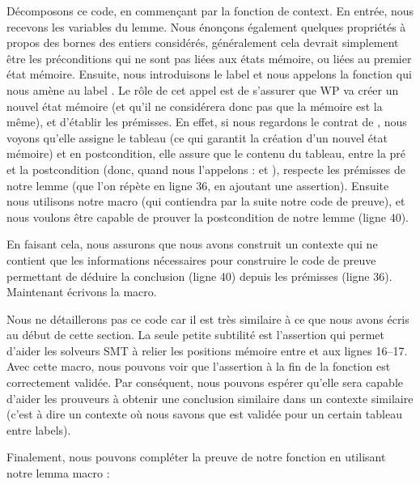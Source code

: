Décomposons ce code, en commençant par la fonction de context. En entrée, nous
recevons les variables du lemme. Nous énonçons également quelques propriétés à
propos des bornes des entiers considérés, généralement cela devrait simplement
être les préconditions qui ne sont pas liées aux états mémoire, ou liées au
premier état mémoire. Ensuite, nous introduisons le label  et nous
appelons la fonction  qui nous amène au label
. Le rôle de cet appel est de s'assurer que WP va créer un nouvel
état mémoire (et qu'il ne considérera donc pas que la mémoire est la même), et
d'établir les prémisses. En effet, si nous regardons le contrat de
, nous voyons qu'elle assigne le tableau (ce qui
garantit la création d'un nouvel état mémoire) et en postcondition, elle assure
que le contenu du tableau, entre la pré et la postcondition (donc, quand nous
l'appelons :  et ), respecte les prémisses de notre
lemme (que l'on répète en ligne 36, en ajoutant une assertion). Ensuite nous
utilisons notre macro  (qui contiendra par la suite notre
code de preuve), et nous voulons être capable de prouver la postcondition de
notre lemme (ligne 40).


En faisant cela, nous assurons que nous avons construit un contexte qui ne
contient que les informations nécessaires pour construire le code de preuve
permettant de déduire la conclusion (ligne 40) depuis les prémisses (ligne 36).
Maintenant écrivons la macro.




Nous ne détaillerons pas ce code car il est très similaire à ce que nous avons
écris au début de cette section. La seule petite subtilité est l'assertion qui
permet d'aider les solveurs SMT à relier les positions mémoire entre
 et  aux lignes 16--17. Avec cette macro, nous
pouvons voir que l'assertion à la fin de la fonction 
 est correctement validée. Par
conséquent, nous pouvons espérer qu'elle sera capable d'aider les prouveurs à
obtenir une conclusion similaire dans un contexte similaire (c'est à dire un
contexte où nous savons que  est validée pour un certain
tableau entre labels).


Finalement, nous pouvons compléter la preuve de notre fonction 
en utilisant notre lemma macro :




